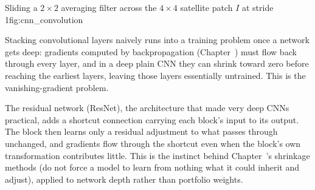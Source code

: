 \documentclass[../ai_in_finance]{subfiles}
\begin{document}
\begin{bookfigure}[htbp]{Sliding a $2\times2$ averaging filter across the $4\times4$ satellite patch $I$ at stride 1}{fig:cnn_convolution}
\end{bookfigure}

Stacking convolutional layers naively runs into a training problem once a network gets deep: gradients computed by backpropagation (Chapter~) must flow back through every layer, and in a deep plain CNN they can shrink toward zero before reaching the earliest layers, leaving those layers essentially untrained. This is the vanishing-gradient problem.

The residual network (ResNet), the architecture that made very deep CNNs practical, adds a shortcut connection carrying each block's input to its output. The block then learns only a residual adjustment to what passes through unchanged, and gradients flow through the shortcut even when the block's own transformation contributes little. This is the instinct behind Chapter~'s shrinkage methods (do not force a model to learn from nothing what it could inherit and adjust), applied to network depth rather than portfolio weights.
\end{document}
